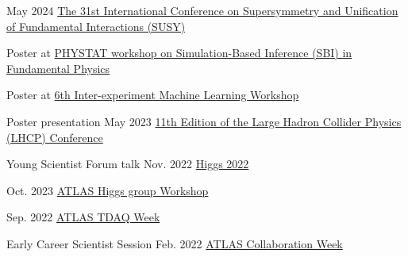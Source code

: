 

\begin{cventries}
    
    {}
    {May 2024}
    {\href{https://indico.cern.ch/event/1354279/contributions/5942297/}{The 31st International Conference on Supersymmetry and Unification of Fundamental Interactions (SUSY)}}
    {}

    {}
    {}
    {}
    {
        \begin{cvitems}
        \item Poster at \href{https://indico.cern.ch/event/1355601/contributions/5910202/}{PHYSTAT workshop on Simulation-Based Inference (SBI) in Fundamental Physics}
        \item Poster at \href{https://indico.cern.ch/event/1297159/contributions/5729232/}{6th Inter-experiment Machine Learning Workshop}
        \end{cvitems}
    }
   
    {Poster presentation}
    {May 2023}
    {\href{https://indico.cern.ch/event/1198609/contributions/5340462/}{11th Edition of the Large Hadron Collider Physics (LHCP) Conference}}
    {}
    
    {Young Scientist Forum talk}
    {Nov. 2022}
    {\href{https://indico.cern.ch/event/1086716/contributions/5049260/}{Higgs 2022}}
    {}

\end{cventries}



\begin{cventries}
    
    {}
    {Oct. 2023}
    {\href{https://indico.cern.ch/event/1280531/contributions/5556190/}{ATLAS Higgs group Workshop}}{}

    {}
    {Sep. 2022}
    {\href{https://indico.cern.ch/event/1172448/contributions/4924082/}{ATLAS TDAQ Week}}
    {}

    {Early Career Scientist Session}
    {Feb. 2022}
    {\href{https://indico.cern.ch/event/1108354/\#167-readiness-of-the-jet-trigg}{ATLAS Collaboration Week}}{}

\end{cventries}
